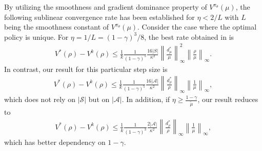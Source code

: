 \begin{remark}
   By utilizing the smoothness and gradient dominance property of $V^{\pi_\theta}(\mu)$, 
    the following sublinear convergence rate has been established for $\eta< 2/L$ with $L$ being the smoothness constant of $V^{\pi_\theta}(\mu)$. Consider the case where the optimal policy is unique.  For $\eta=1/L=(1-\gamma)^3/8$, the best rate obtained in \textup{\cite[Theorem~4]{Mei_Xiao_Szepesvari_Schuurmans_2020}} is
\begin{align*}
V^*\left( \rho \right) -V^{k}\left( \rho \right) \le \frac{1}{k}\frac{1}{\left( 1-\gamma \right) ^5}\frac{16\left| S \right|}{\kappa^2}\left\| \frac{d_{\mu}^{*}}{\mu} \right\| _{\infty}^{2}\left\|\frac{\rho}{\mu}\right\|_\infty.
\end{align*}
In contrast, our result for this particular step size is 
\begin{align*}
V^*(\rho)-V^k(\rho)\leq \frac{1}{k}\frac{1}{(1-\gamma)^5}\frac{16|\mathcal{A}|}{\kappa^2}\left\|\frac{d_\rho^*}{\rho}\right\|_\infty\left\|\frac{1}{\mu}\right\|_\infty,
\end{align*}
which does not rely on $|\mathcal{S}|$ but on $|\mathcal{A}|$. In addition, if $\eta\geq \frac{1-\gamma}{\tilde{\mu}}$, our result reduces to 
\begin{align*}
V^*(\rho)-V^k(\rho)\leq \frac{1}{k}\frac{1}{(1-\gamma)^3}\frac{2|\mathcal{A}|}{\kappa^2}\left\|\frac{d_\rho^*}{\rho}\right\|_\infty\left\|\frac{1}{\mu}\right\|_\infty,
\end{align*}
which has better dependency on $1-\gamma$.
\end{remark}



